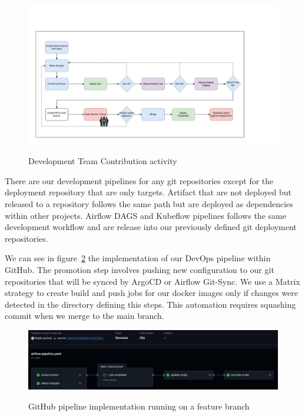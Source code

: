 \begin{figure}[!htbp]
    \centering
    \caption{Development Team Contribution activity}
    \includegraphics[scale=0.3]{images/project/cicd-workflow-p2}
    \label{fig:cd-workflow-p2}
\end{figure}

There are our development pipelines for any git repositories except for the deployment repository that are only targets.
Artifact that are not deployed but released to a repository follows the same path but are deployed as dependencies within other projects.
Airflow DAGS and Kubeflow pipelines follows the same development workflow and are release into our previously defined git deployment repositories.

We can see in figure~\ref{fig:github-pipeline} the implementation of our DevOps pipeline within GitHub.
The promotion step involves pushing new configuration to our git repositories that will be synced by ArgoCD or Airflow Git-Sync.
We use a Matrix strategy to create build and push jobs for our docker images only if changes were detected in the directory defining this steps.
This automation requires squashing commit when we merge to the main branch.

\begin{figure}[!htbp]
    \centering
    \caption{GitHub pipeline implementation running on a feature branch}
    \includegraphics[scale=0.4]{images/project/github-pipeline}
    \label{fig:github-pipeline}
\end{figure}

